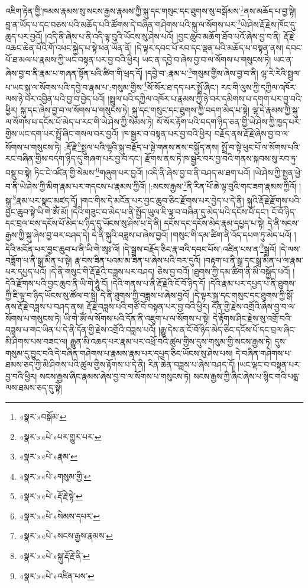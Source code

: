 འཇིག་རྟེན་གྱི་ཁམས་རྣམས་སུ་སངས་རྒྱས་རྣམས་ཀྱི་སྐུ་དང་གསུང་དང་ཐུགས་སུ་བསྒོམས་\footnote{«སྣར་»བསྒོམ་}ནས་མཆོད་པ་བྱ་སྟེ། བླ་ན་ཡོད་པ་དང་བཅས་པའི་མཆོད་པའི་ཚོགས་དེ་བཞིན་གཤེགས་པའི་སྐུ་ལ་སོགས་པར་\footnote{«སྣར་»«པེ་»པར་གྱུར་པར་}ཡེ་ཤེས་རྡོ་རྗེས་ཁོང་དུ་ཆུད་པར་བྱའོ། །འདི་ནི་ཞེས་པ་ནི་འདི་ལྟ་བུའི་ཡོངས་སུ་ཤེས་པའོ། །བྱང་ཆུབ་མཆོག་ཐོབ་པའོ་ཞེས་བྱ་བ་ནི། རྡོ་རྗེ་འཆང་ཆེན་པོའི་གོ་འཕང་སྐྱེད་པ་སྟེ་ཕན་ཡོན་ནོ། །དེ་ལྟར་དབང་པོ་རབ་དང་ལྡན་པའི་མཆོད་པ་བསྟན་ནས། དབང་པོ་ཐ་མལ་པ་རྣམས་ཀྱི་ཡང་བསྟན་པར་བྱ་བའི་ཕྱིར། ཡང་ན་དབྱེ་བ་ཞེས་བྱ་བ་ལ་སོགས་པ་གསུངས་ཏེ། ཡང་ན་ཞེས་བྱ་བ་ནི་རྣམ་པ་གཞན་སྟོན་པའི་ཚིག་གི་ཕྲད་དོ། །དབྱེ་བ་:རྣམ་པ་\footnote{«སྣར་»«པེ་»རྣམ་}གསུམ་གྱིས་ཞེས་བྱ་བ་ནི། ལྷ་རེ་རེའི་སྤྲུལ་པ་ཡང་སྐུ་ལ་སོགས་པའི་དབྱེ་བ་རྣམ་པ་:གསུམ་གྱིས་\footnote{«སྣར་»«པེ་»གསུམ་གྱི་}སོ་སོར་ཐ་དད་པར་སྤྲོ་ཞིང་། རང་གི་ལུས་ཀྱི་དཀྱིལ་འཁོར་ལས་ཉེ་བར་འབྱིན་པའི་བྱ་བ་བྱེད་པའོ། །སྤྲུལ་པའི་དཀྱིལ་འཁོར་པ་རྣམས་ཀྱི་ཉེ་བར་དམིགས་པ་དགག་པར་བྱ་བའི་ཕྱིར། སྐུ་དང་ཞེས་བྱ་བ་ལ་སོགས་པ་གསུངས་ཏེ། སྐུ་དང་གསུང་དང་ཐུགས་ཀྱི་བདག་མེད་པ་སྟེ། ལྷ་དེ་རྣམས་ཀྱི་སྐུ་ལ་སོགས་པ་དངོས་པོ་མེད་པ་རང་གི་ཡེ་ཤེས་ཀྱི་སེམས་ཏེ། སོ་སོར་རྟོག་པའི་བདག་ཉིད་ཅན་གྱི་ཡེ་ཤེས་ཀྱི་ཁྱད་པར་གྱིས་ཡང་དག་པར་སྤྲོ་ཞིང་གསལ་བར་བྱའོ། །ཁ་སྦྱར་བ་བསྟན་པར་བྱ་བའི་ཕྱིར། བརྗོད་ནས་རྡོ་རྗེ་ཞེས་བྱ་བ་ལ་སོགས་པ་གསུངས་ཏེ། :རྡོ་རྗེ་\footnote{«སྣར་»«པེ་»རྡོ་རྗེ་སྟེ་}སྤྲུལ་པའི་ལྷའི་སྐུ་བརྗོད་པ་སྟེ་གནས་ནས་བསྐྱོད་ནས། སྤྲོ་བ་སྟེ་ཕུང་པོ་ལ་སོགས་པའི་རང་བཞིན་གྱིས་བདག་ཉིད་དུ་གཞག་པར་བྱ་བ་དང་། རྫོགས་ནས་ཏེ་ཁ་སྦྱར་བར་བྱ་བའི་གནས་སྐབས་སུ་རབ་ཏུ་བསྡུ་བ་སྟེ། ཏིང་ངེ་འཛིན་གྱི་སེམས་\footnote{«སྣར་»«པེ་»སེམས་དཔར་}གཞུག་པར་བྱའོ། །འདི་ནི་ཞེས་བྱ་བ་ནི་བཤད་མ་ཐག་པའོ། །ཡེ་ཤེས་ཀྱི་སྤྱན་ཕྱེ་བ་ནི་ཡེ་ཤེས་ཀྱི་མིག་རྣམ་པར་གདངས་པ་རྣམས་ཀྱིའོ། །:སངས་རྒྱས་\footnote{«སྣར་»«པེ་»སངས་རྒྱས་རྣམས་}ནི་རིན་པོ་ཆེ་ལྟ་བུའི་གང་ཟག་རྣམས་ཀྱིའོ། །སྐུ་\footnote{«སྣར་»«པེ་»སྐུ་རྡོ་རྗེ་ནི་}རྣམ་པར་སྣང་མཛད་དོ། །གང་གིས་དེ་མངོན་པར་བྱང་ཆུབ་ཅིང་རྫོགས་པར་བྱེད་པ་དེ་ནི། སྐུའི་རྡོ་རྗེ་རྫོགས་པའི་བྱང་ཆུབ་སྟེ་ཡི་གེ་ཨོཾ་མོ། །དེའི་གཟུང་བ་མེད་པ་ནི་སྤྱོད་ཡུལ་ཇི་ལྟ་བ་བཞིན་དུ་མེད་པའི་དངོས་པོ་དང་། ངོ་བོ་ཉིད་དང་བྲལ་བས་དངོས་པོ་མེད་པ་ཉིད་དུ་ཡོངས་སུ་ཤེས་པ་དེ་ནི། དངོས་དང་དངོས་མེད་རྣམ་དཔྱད་པ་སྟེ། དེ་ནི་སངས་རྒྱས་ཀྱི་སྐུ་ཞེས་བྱ་བར་བཤད་དེ། དེ་ནི་སྐུའི་བཟླས་པ་ཞེས་བྱའོ། །གསུང་གི་དམ་ཚིག་ནི་འོད་དཔག་ཏུ་མེད་པའོ། །དེའི་མངོན་པར་བྱང་ཆུབ་པ་ནི་ཡི་གེ་ཨཱཿ་འོ། །དེ་སྒྲས་བརྗོད་ཅིང་རྣ་བའི་དབང་པོས་:འཛིན་པས་ན་\footnote{«སྣར་»«པེ་»འཛིན་པས་}སྒྲའོ། །དེ་ལས་བཟློག་པ་ནི་སྒྲ་མིན་པ་སྟེ། རྣ་བས་ཟིན་པའམ་མ་ཟིན་པ་ཞེས་པའི་བར་དུའོ། །བརྟག་པ་ནི་སྒྲ་དང་སྒྲ་མིན་པ་ལ་རྣམ་པར་དཔྱད་པའོ། །དེ་ནི་གསུང་གི་རྡོ་རྗེའི་བཟླས་པར་བཤད། ཅེས་བྱ་བའོ། །ཐུགས་ཀྱི་དམ་ཚིག་ནི་མི་བསྐྱོད་པའོ། །དེའི་རྫོགས་པའི་བྱང་ཆུབ་ནི་ཡི་གེ་ཧཱུཾ་ངོ། །དེའི་གནས་པ་ནི་རྡོ་རྗེའི་ངོ་བོ་ཉིད་དོ། །དེའི་རྣམ་པར་དཔྱད་པ་ནི་ཐུགས་ཀྱི་ཇི་ལྟ་བ་ཉིད་ཡོངས་སུ་ཚོལ་བ་སྟེ། དེ་ནི་ཐུགས་ཀྱི་བཟླས་པ་ཞེས་བྱའོ། །དེ་ལྟར་སྐུ་དང་གསུང་དང་ཐུགས་ཀྱི་སྒོ་ནས་རྡོ་རྗེ་བཟླས་པ་བཤད་ནས། རྡོ་རྗེ་བཟླས་པའི་གཙོ་བོ་བསྟན་པར་བྱ་བའི་ཕྱིར། དོན་གྱི་རྗེས་འགྲོའི་ཞེས་བྱ་བ་ལ་སོགས་པ་གསུངས་ཏེ། ཡི་གེ་ཨོཾ་ལ་སོགས་པའི་དོན་ནི་འཇུག་པ་ལ་སོགས་པ་སྟེ། དེ་རྟོགས་ཤིང་རྗེས་སུ་འགྲོ་བའི་བཟླས་པ་གང་ཡིན་པ་དེ་ནི་དོན་གྱི་རྗེས་འགྲོའི་བཟླས་པའོ། །རྒྱུ་དེས་ན་ངོ་བོ་ཉིད་མེད་ཅིང་དངོས་པོ་དང་བྲལ་ཞིང་མི་ཤིགས་པས་བཟང་ལ། རྒྱུན་མི་འཆད་པར་རྣམ་པར་འཕྲོ་བའི་ཚུལ་གྱིས་དུས་གསུམ་གྱི་སངས་རྒྱས་ཏེ། དུས་གསུམ་དུ་བྱུང་བའི་དེ་བཞིན་གཤེགས་པ་རྣམས་རྣམ་པར་དཔྱད་ཅིང་ཡོངས་སུ་ཤེས་པས། དེ་བཞིན་གཤེགས་པ་ཐམས་ཅད་ཀྱི་མི་ཤིགས་པའི་ཚུལ་གྱིས་རྟོགས་པ་དེ་ནི། རིན་ཆེན་བཟླས་པ་ཞེས་བཤད་དོ། །ཡང་ལྡང་བ་བསྟན་པར་བྱ་བའི་ཕྱིར། སངས་རྒྱས་ཞིང་རྣམས་ཞེས་བྱ་བ་ལ་སོགས་པ་གསུངས་ཏེ། སངས་རྒྱས་ཀྱི་ཞིང་ཞེས་པ་སྙིང་གའི་པདྨ་ལས་ཐམས་ཅད་དུ་སྟེ། 